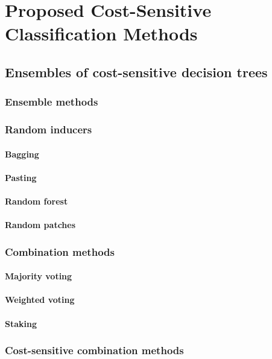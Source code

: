 \documentclass[twoside,openright,titlepage,numbers=noenddot,headinclude,%
               footinclude=true,cleardoublepage=empty,abstractoff,BCOR=5mm,%
               paper=a4,fontsize=12pt,ngerman,american]{scrreprt} %
\numberwithin{theorem}{chapter}
\numberwithin{definition}{chapter}
\numberwithin{algorithm}{chapter}
\numberwithin{figure}{chapter}
\numberwithin{table}{chapter}
\numberwithin{equation}{chapter}
\begin{document}
\part{Proposed Cost-Sensitive Classification Methods}

	\cleardoublepage
	\cleardoublepage
	\cleardoublepage

		
	\chapter{Ensembles of cost-sensitive decision trees}
		\section{Ensemble methods}
			\section{Random inducers}
				\subsection{Bagging}
				\subsection{Pasting}
				\subsection{Random forest}
				\subsection{Random patches}
			\section{Combination methods}
				\subsection{Majority voting}
				\subsection{Weighted voting}
				\subsection{Staking}
		\section{Cost-sensitive combination methods}
\end{document}
